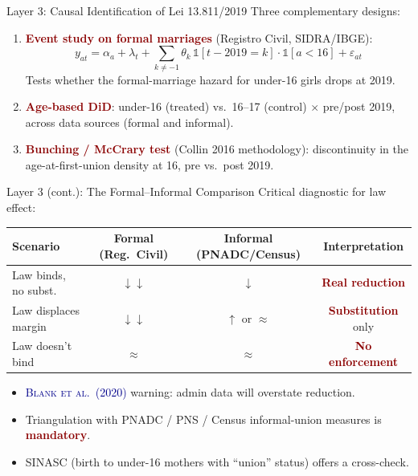 \documentclass[aspectratio=169,10pt]{beamer}
\newcommand{\onecite}[1]{\textcolor{darkblue}{\textsc{#1}}}
\newcommand{\hl}[1]{\textcolor{darkred}{\textbf{#1}}}
\begin{document}
\begin{frame}{Layer 3: Causal Identification of Lei 13.811/2019}
    Three complementary designs:
    \begin{enumerate}
        \item \hl{Event study on formal marriages} (Registro Civil, SIDRA/IBGE):
        \[
            y_{at} = \alpha_a + \lambda_t + \sum_{k \neq -1} \theta_k \, \mathbb{1}[t - 2019 = k]\cdot\mathbb{1}[a<16] + \varepsilon_{at}
        \]
        Tests whether the formal-marriage hazard for under-16 girls drops at 2019.

        \item \hl{Age-based DiD}: under-16 (treated) vs.\ 16--17 (control) $\times$ pre/post 2019, across data sources (formal and informal).

        \item \hl{Bunching / McCrary test} (Collin 2016 methodology): discontinuity in the age-at-first-union density at 16, pre vs.\ post 2019.
    \end{enumerate}
\end{frame}

\begin{frame}{Layer 3 (cont.): The Formal--Informal Comparison}
    Critical diagnostic for law effect:

    \vspace{0.3cm}
    \centering
    \begin{tabular}{l|c|c|c}
        \toprule
        \textbf{Scenario} & \textbf{Formal (Reg.\ Civil)} & \textbf{Informal (PNADC/Census)} & \textbf{Interpretation} \\
        \midrule
        Law binds, no subst.\ & $\downarrow\downarrow$ & $\downarrow$ & \hl{Real reduction} \\
        Law displaces margin & $\downarrow\downarrow$ & $\uparrow$ or $\approx$ & \hl{Substitution} only \\
        Law doesn't bind & $\approx$ & $\approx$ & \hl{No enforcement} \\
        \bottomrule
    \end{tabular}

    \vspace{0.4cm}
    \begin{itemize}
        \item \onecite{Blank et al.\ (2020)} warning: admin data will overstate reduction.
        \item Triangulation with PNADC / PNS / Census informal-union measures is \hl{mandatory}.
        \item SINASC (birth to under-16 mothers with ``union'' status) offers a cross-check.
    \end{itemize}
\end{frame}
\end{document}
